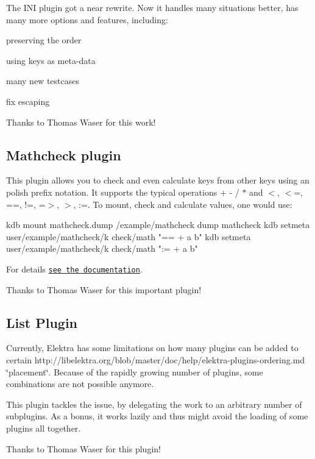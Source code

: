The I\+N\+I plugin got a near rewrite. Now it handles many situations better, has many more options and features, including\+:


\begin{DoxyItemize}
\item preserving the order
\item using keys as meta-\/data
\item many new testcases
\item fix escaping
\end{DoxyItemize}

Thanks to Thomas Waser for this work!

\subsection*{Mathcheck plugin}

This plugin allows you to check and even calculate keys from other keys using an polish prefix notation. It supports the typical operations {\ttfamily + -\/ / $\ast$} and {\ttfamily $<$, $<$=, ==, !=, =$>$, $>$, \+:=}. To mount, check and calculate values, one would use\+: \begin{DoxyVerb}kdb mount mathcheck.dump /example/mathcheck dump mathcheck
kdb setmeta user/example/mathcheck/k check/math "== + a b"
kdb setmeta user/example/mathcheck/k check/math ":= + a b"
\end{DoxyVerb}


For details \href{http://libelektra.org/blob/master/src/plugins/mathcheck/}{\tt see the documentation}.

Thanks to Thomas Waser for this important plugin!

\subsection*{List Plugin}

Currently, Elektra has some limitations on how many plugins can be added to certain http\+://libelektra.org/blob/master/doc/help/elektra-\/plugins-\/ordering.\+md \char`\"{}placement\char`\"{}. Because of the rapidly growing number of plugins, some combinations are not possible anymore.

This plugin tackles the issue, by delegating the work to an arbitrary number of subplugins. As a bonus, it works lazily and thus might avoid the loading of some plugins all together.

Thanks to Thomas Waser for this plugin!

